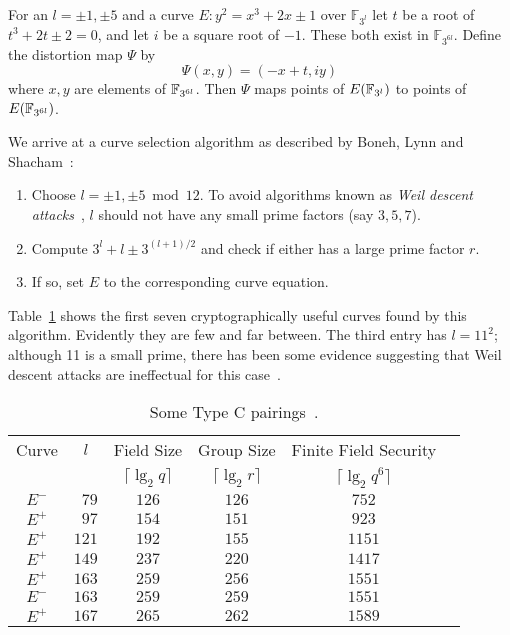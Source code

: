 For an $l = \pm 1, \pm 5$ and a
curve $E : y^2 = x^3 + 2 x \pm 1$ over $\mathbb{F}_{3^l}$
let $t$ be a root of $t^3 + 2t \pm 2 = 0$, and let $i$ be a
square root of $-1$. These both exist in $\mathbb{F}_{3^{6l}}$.
Define the distortion map $\Psi$ by
\[ \Psi(x,y) = (-x + t, i y) \]
where $x, y$ are elements of $\mathbb{F}_{3^{6l}}$. Then $\Psi$ maps points
of $E(\mathbb{F}_{3^l})$ to points of $E(\mathbb{F}_{3^{6l}})$.

We arrive at a curve selection algorithm as described by
Boneh, Lynn and Shacham~\cite{bls}:

\begin{enumerate}
\item
Choose $l = \pm 1, \pm 5 \bmod 12$. To avoid algorithms known as
\emph{Weil descent attacks}~\cite{weildescent1, weildescent2},
$l$ should not have any small prime factors (say $3,5,7$).
\item
Compute $3^l + l \pm 3^{(l+1)/2}$ and check if either has a large prime
factor $r$.
\item
If so, set $E$ to the corresponding curve equation.
\end{enumerate}

Table~\ref{tbl:typec} shows the first seven cryptographically useful curves
found by this algorithm. Evidently they are few and far between.
The third entry has $l = 11^2$; although 11 is a small
prime, there has been some evidence suggesting that Weil descent attacks
are ineffectual for this case~\cite{ghsonodd}.

\begin{table}
\begin{center}
\begin{tabular}{|c|c|c|c|c|c|}

  \hline
  Curve & $l$ & Field       Size      & Group Size         & Finite Field Security \\
        &     & $\lceil\lg_2 q \rceil$ & $\lceil \lg_2 r \rceil$ &
    $\lceil \lg_2 {q^6} \rceil$ \\

  \hline
  $E^-$ & $\phantom079$ & $126$ & $126$ & $752$ \\
  \hline
  $E^+$ & $\phantom097$  & $154$ & $151$ & $923$ \\
  \hline
  $E^+$ & $121$ & $192$ & $155$ & $1151$ \\
  \hline
  $E^+$ & $149$ & $237$ & $220$ & $1417$ \\
  \hline
  $E^+$ & $163$ & $259$ & $256$ & $1551$ \\
  \hline
  $E^-$ & $163$ & $259$ & $259$ & $1551$ \\
  \hline
  $E^+$ & $167$ & $265$ & $262$ & $1589$ \\
  \hline
\end{tabular}
\end{center}
\caption{  \label{tbl:typec}
  Some Type C pairings~\cite{bls}.
}
\end{table}

